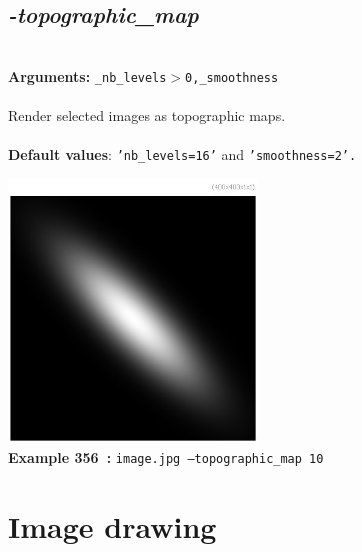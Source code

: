 \documentclass[a4paper,11pt,twoside]{book}
\begin{document}
\subsection{\emph{-topographic\_map} }\vspace*{-0.5em}
~\\\textbf{Arguments: } 
{\small \texttt{\_nb\_levels$>$0,\_smoothness}}\\~\\
Render selected images as topographic maps.
~\\~\\\textbf{Default values}: {\small \texttt{'nb\_levels=16'} and \texttt{'smoothness=2'.}}
\begin{center}\includegraphics[keepaspectratio=true,height=7cm,width=\textwidth]{img/gmic_def356.jpg}\\
{\footnotesize \textbf{Example 356~:} \texttt{image.jpg --topographic\_map 10}}
\end{center}
\section{Image drawing}
\end{document}
